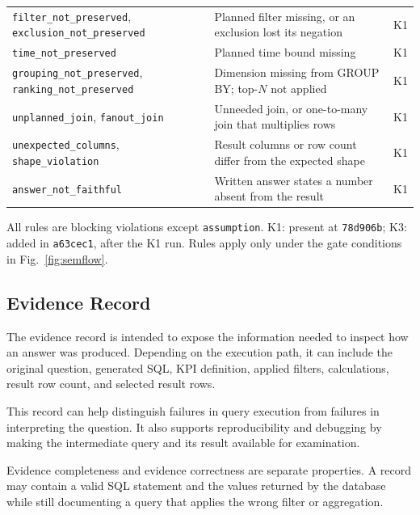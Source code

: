 \documentclass[conference]{IEEEtran}
\begin{document}
\begin{table}[!t]
\begin{tabular}{@{}>{\raggedright}p{}>{\raggedright}p{}>{\centering\arraybackslash}p{}@{}}
\texttt{filter\_\allowbreak{}not\_\allowbreak{}preserved}, \texttt{exclusion\_\allowbreak{}not\_\allowbreak{}preserved} & Planned filter missing, or an exclusion lost its negation & K1 \\
\texttt{time\_\allowbreak{}not\_\allowbreak{}preserved} & Planned time bound missing & K1 \\
\texttt{grouping\_\allowbreak{}not\_\allowbreak{}preserved}, \texttt{ranking\_\allowbreak{}not\_\allowbreak{}preserved} & Dimension missing from GROUP BY; top-$N$ not applied & K1 \\
\texttt{unplanned\_\allowbreak{}join}, \texttt{fanout\_\allowbreak{}join} & Unneeded join, or one-to-many join that multiplies rows & K1 \\
\texttt{unexpected\_\allowbreak{}columns}, \texttt{shape\_\allowbreak{}violation} & Result columns or row count differ from the expected shape & K1 \\
\texttt{answer\_\allowbreak{}not\_\allowbreak{}faithful} & Written answer states a number absent from the result & K1 \\
\bottomrule
\end{tabular}

\vspace{3pt}
\parbox{\columnwidth}{\scriptsize All rules are blocking violations except \texttt{assumption}. K1: present at \texttt{78d906b}; K3: added in \texttt{a63cec1}, after the K1 run. Rules apply only under the gate conditions in Fig.~\ref{fig:semflow}.}
\end{table}

\subsection{Evidence Record}

The evidence record is intended to expose the information needed to inspect how an answer was produced. Depending on the execution path, it can include the original question, generated SQL, KPI definition, applied filters, calculations, result row count, and selected result rows.

This record can help distinguish failures in query execution from failures in interpreting the question. It also supports reproducibility and debugging by making the intermediate query and its result available for examination.

Evidence completeness and evidence correctness are separate properties. A record may contain a valid SQL statement and the values returned by the database while still documenting a query that applies the wrong filter or aggregation.
\end{document}
